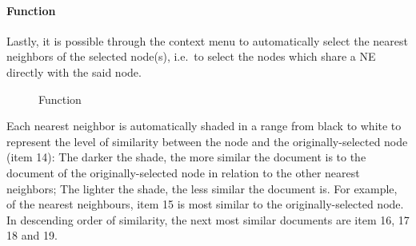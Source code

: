 \paragraph{ Function}
Lastly, it is possible through the context menu to automatically select the nearest neighbors of the selected node(s), i.e.\ to select the nodes which share a NE directly with the said node.

\begin{figure}[ht]
\centering
\caption{ Function}
\end{figure}

Each nearest neighbor is automatically shaded in a range from black to white to represent the level of similarity between the node and the originally-selected node (item 14): The darker the shade, the more similar the document is to the document of the originally-selected node in relation to the other nearest neighbors; The lighter the shade, the less similar the document is. For example, of the nearest neighbours, item 15 is most similar to the originally-selected node. In descending order of similarity, the next most similar documents are item 16, 17 18 and 19.

